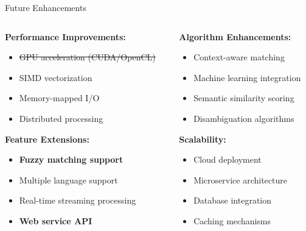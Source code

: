 \documentclass[aspectratio=169]{beamer}
\begin{document}
\begin{frame}{Future Enhancements}
\begin{columns}
\begin{column}{0.5\textwidth}
\textbf{Performance Improvements:}
\begin{itemize}
    \item \sout{GPU acceleration (CUDA/OpenCL)}
    \item SIMD vectorization
    \item Memory-mapped I/O
    \item Distributed processing
\end{itemize}

\vspace{0.3cm}
\textbf{Feature Extensions:}
\begin{itemize}
    \item \textbf{Fuzzy matching support}
    \item Multiple language support
    \item Real-time streaming processing
    \item \textbf{Web service API}
\end{itemize}
\end{column}
\begin{column}{0.5\textwidth}
\textbf{Algorithm Enhancements:}
\begin{itemize}
    \item Context-aware matching
    \item Machine learning integration
    \item Semantic similarity scoring
    \item Disambiguation algorithms
\end{itemize}

\vspace{0.3cm}
\textbf{Scalability:}
\begin{itemize}
    \item Cloud deployment
    \item Microservice architecture
    \item Database integration
    \item Caching mechanisms
\end{itemize}
\end{column}
\end{columns}
\end{frame}
\end{document}
